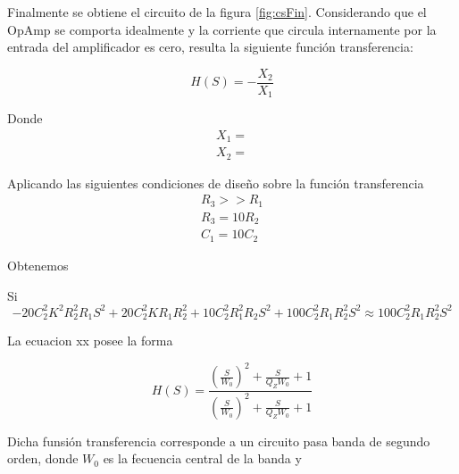 \documentclass[../../tc_tp3_main.tex]{subfiles}
\begin{document}
Finalmente se obtiene el circuito de la figura \ref{fig:csFin}. Considerando que el OpAmp se comporta idealmente y la corriente que circula internamente por la entrada del amplificador es cero, resulta la siguiente  función transferencia:

\begin{equation}
H(S)=- \frac{X_2}{X_1}\label{eq:circuitoRed}
\end{equation}

Donde
\begin{gather}
X_1=    \\
X_2=
\end{gather}

Aplicando las siguientes condiciones de diseño sobre la función transferencia
\begin{gather}
 R_3 >> R_1   \\
 R_3 =10 R_2   \\
C_1=10C_2
\end{gather}

Obtenemos


Si
\begin{equation}
-20C_{2}^2 K^2 R_{2}^2 R_{1}  S^{2} + 20 C_{2}^{2} K R_{1} R_{2}^2+ 10 C_{2}^2 R_{1}^2 R_{2} S^{2} + 100 C_{2}^{2} R_{1} R_{2}^2 S^{2} \approx 100 C_{2}^2 R_{1} R_{2} ^2 S^2
\end{equation}


La ecuacion xx posee la forma

\begin{equation}
H(S)=\frac {\left( \frac{S}{W_0} \right) ^2 + \frac{S}{Q_Z W_0} +1}{\left( \frac{S}{W_0} \right) ^2 +\frac{S}{Q_Z W_0}+1}
\end{equation}

Dicha funsión transferencia corresponde a un circuito pasa banda de segundo orden, donde $W_0$ es la fecuencia central de la banda y 
\end{document}
